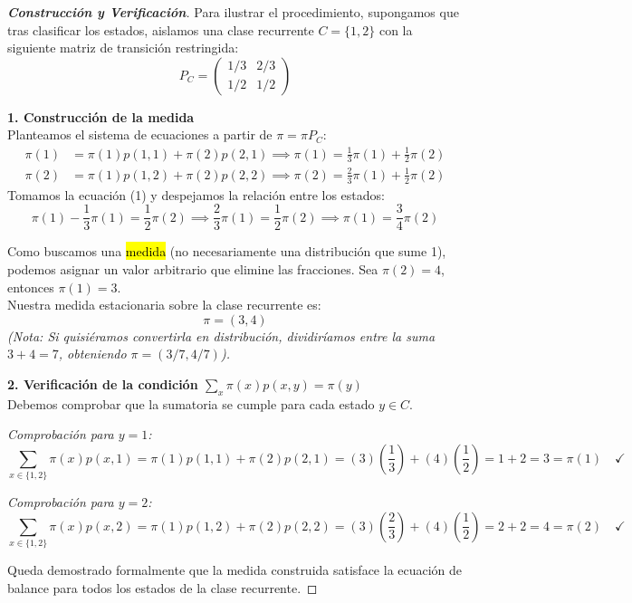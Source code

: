\documentclass[10pt,a4paper]{article}
\begin{document}
\begin{proof}[\textbf{Construcción y Verificación}]
    Para ilustrar el procedimiento, supongamos que tras clasificar los estados, aislamos una clase recurrente $C = \{1, 2\}$ con la siguiente matriz de transición restringida:
    \[ P_C = \begin{pmatrix} 1/3 & 2/3 \\ 1/2 & 1/2 \end{pmatrix} \]

    \textbf{1. Construcción de la medida} \\
    Planteamos el sistema de ecuaciones a partir de $\pi = \pi P_C$:
    \begin{align}
        \pi(1) &= \pi(1)p(1,1) + \pi(2)p(2,1) \implies \pi(1) = \frac{1}{3}\pi(1) + \frac{1}{2}\pi(2) \\
        \pi(2) &= \pi(1)p(1,2) + \pi(2)p(2,2) \implies \pi(2) = \frac{2}{3}\pi(1) + \frac{1}{2}\pi(2)
    \end{align}
    Tomamos la ecuación (1) y despejamos la relación entre los estados:
    \[ \pi(1) - \frac{1}{3}\pi(1) = \frac{1}{2}\pi(2) \implies \frac{2}{3}\pi(1) = \frac{1}{2}\pi(2) \implies \pi(1) = \frac{3}{4}\pi(2) \]
    
    Como buscamos una \hl{medida} (no necesariamente una distribución que sume 1), podemos asignar un valor arbitrario que elimine las fracciones. Sea $\pi(2) = 4$, entonces $\pi(1) = 3$. \\
    Nuestra medida estacionaria sobre la clase recurrente es:
    \[ \pi = (3, 4) \]
    \textit{(Nota: Si quisiéramos convertirla en distribución, dividiríamos entre la suma $3+4=7$, obteniendo $\pi = (3/7, 4/7)$).}

    \vspace{3mm}
    \textbf{2. Verificación de la condición $\sum_x \pi(x)p(x,y) = \pi(y)$} \\
    Debemos comprobar que la sumatoria se cumple para cada estado $y \in C$.

    \textit{Comprobación para $y = 1$:}
    \[ \sum_{x \in \{1,2\}} \pi(x)p(x,1) = \pi(1)p(1,1) + \pi(2)p(2,1) = (3)\left(\frac{1}{3}\right) + (4)\left(\frac{1}{2}\right) = 1 + 2 = 3 = \pi(1) \quad \checkmark \]
    
    \textit{Comprobación para $y = 2$:}
    \[ \sum_{x \in \{1,2\}} \pi(x)p(x,2) = \pi(1)p(1,2) + \pi(2)p(2,2) = (3)\left(\frac{2}{3}\right) + (4)\left(\frac{1}{2}\right) = 2 + 2 = 4 = \pi(2) \quad \checkmark \]
    
    Queda demostrado formalmente que la medida construida satisface la ecuación de balance para todos los estados de la clase recurrente.
\end{proof}
\end{document}

